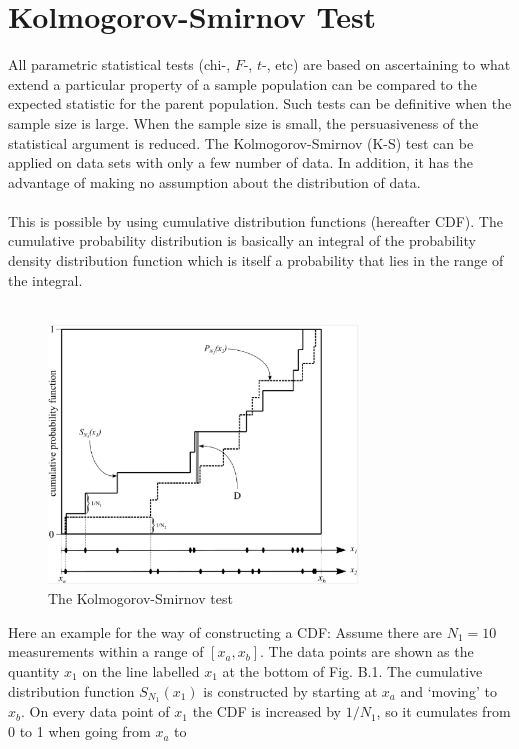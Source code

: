 \section{Kolmogorov-Smirnov Test}\label{kstest}
All parametric statistical tests (chi-, $F$-, $t$-, etc) are based
on ascertaining to what extend a particular property of a sample
population can be compared to the expected statistic for the
parent population. Such tests can be definitive when the sample
size is large. When the sample size is small, the persuasiveness
of the statistical argument is reduced. The Kolmogorov-Smirnov
(K-S) test can be applied on data sets with only a few number of
data. In addition, it has the advantage of making no assumption
about the distribution of data.\\\\
This is possible by using cumulative distribution functions
(hereafter CDF). The cumulative probability distribution is
basically an integral of the probability density distribution
function which is itself a probability that lies in the range of
the integral.\\\\
\begin{figure}\label{ks}
\centering
   \includegraphics[height=6.9cm]{ks.eps}
   \caption{The Kolmogorov-Smirnov test}
\end{figure}
Here an example for the way of constructing a CDF: Assume there
are $N_1=10$ measurements within a range of $[x_a,x_b]$. The data
points are shown as the quantity $x_1$ on the line labelled $x_1$
at the bottom of Fig. B.1. The cumulative distribution function
$S_{N_1}(x_1)$ is constructed by starting at $x_a$ and `moving' to
$x_b$. On every data point of $x_1$ the CDF is increased by
$1/N_1$, so it cumulates from 0 to 1 when going from $x_a$ to
